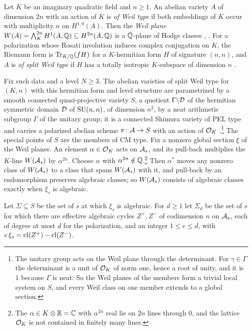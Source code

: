Let $K$ be an imaginary quadratic field and $n\ge1$. An abelian variety $A$
of dimension $2n$ with an action of $K$ is \emph{of Weil type} if both
embeddings of $K$ occur with multiplicity $n$ on $H^{1,0}(A)$. Then the
\emph{Weil plane} $W(A)=\bigwedge^{2n}_{K}H^{1}(A,\mathbb{Q})\subseteq
H^{2n}(A,\mathbb{Q})$ is a $\mathbb{Q}$-plane of Hodge classes \cite{Wei77},
\cite[\S4]{Del82}. For a polarization whose Rosati involution induces
complex conjugation on $K$, the Riemann form is
$\operatorname{Tr}_{K/\mathbb{Q}}(f H)$ for a $K$-hermitian form $H$ of signature
$(n,n)$, and $A$ is \emph{of split Weil type} if $H$ has a totally isotropic
$K$-subspace of dimension $n$ \cite[\S2.1]{Mil20}.

Fix such data and a level $N\ge3$. The abelian varieties of split Weil type
for $(K,n)$ with this hermitian form and level structure are parametrized by
a smooth connected quasi-projective variety $S$, a quotient $\Gamma\backslash
\mathcal{D}$ of the hermitian symmetric domain $\mathcal{D}$ of $\operatorname{SU}(n,n)$, of dimension
$n^{2}$, by a neat arithmetic subgroup $\Gamma$ of the unitary group; it is a
connected Shimura variety of PEL type and carries a polarized abelian scheme
$\pi\colon\mathcal{A}\to S$ with an action of $\mathcal{O}_{K}$
\cite{Wei77,vG94}.\footnote{The unitary group acts on the Weil plane through
the determinant. For $\gamma\in\Gamma$ the determinant is a unit of $\mathcal{O}_{K}$
of norm one, hence a root of unity, and it is $1$ because $\Gamma$ is neat.
So the Weil planes of the members form a trivial local system on $S$, and
every Weil class on one member extends to a global section.} The special
points of $S$ are the members of CM type. Fix a nonzero global section $\xi$
of the Weil planes. An element $\alpha\in\mathcal{O}_{K}$ acts on $\mathcal{A}_{s}$, and its
pull-back multiplies the $K$-line $W(\mathcal{A}_{s})$ by $\alpha^{2n}$. Choose
$\alpha$ with $\alpha^{2n}\notin\mathbb{Q}$.\footnote{The $\alpha\in K\otimes\mathbb{R}=\mathbb{C}$
with $\alpha^{2n}$ real lie on $2n$ lines through $0$, and the lattice
$\mathcal{O}_{K}$ is not contained in finitely many lines.} Then $\alpha^{*}$ moves
any nonzero class of $W(\mathcal{A}_{s})$ to a class that spans $W(\mathcal{A}_{s})$ with it,
and pull-back by an endomorphism preserves algebraic classes; so
$W(\mathcal{A}_{s})$ consists of algebraic classes exactly when $\xi_{s}$ is
algebraic.

\begin{definition}\label{def:sigmad}
Let $\Sigma\subseteq S$ be the set of $s$ at which $\xi_{s}$ is algebraic.
For $d\ge1$ let $\Sigma_{d}$ be the set of $s$ for which there are effective
algebraic cycles $Z^{+},Z^{-}$ of codimension $n$ on $\mathcal{A}_{s}$, each of
degree at most $d$ for the polarization, and an integer $1\le e\le d$, with
$e\,\xi_{s}=\operatorname{cl}(Z^{+})-\operatorname{cl}(Z^{-})$.
\end{definition}

